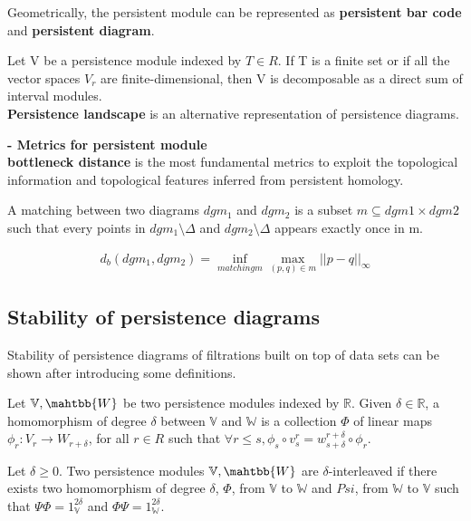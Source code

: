 Geometrically, the persistent module can be represented as \textbf{persistent bar code} and \textbf{persistent diagram}.

\begin{theorem}
Let V be a persistence module indexed by $T \in R$. If T is a finite set or if all the vector spaces $V_r$ are finite-dimensional, then V is decomposable as a direct sum of interval modules.\\
\textbf{Persistence landscape} is an alternative representation of persistence diagrams.\\
\end{theorem}

\textbf{- Metrics for persistent module}\\
\textbf{bottleneck distance} is the most fundamental metrics to exploit the topological information and topological features inferred from persistent homology.

\begin{definition}
A matching between two diagrams $dgm_1$ and $dgm_2$ is a subset $m \subseteq dgm1 \times dgm2$ such that every points in $dgm_1 \setminus \Delta$ and $dgm_2 \setminus \Delta$ appears exactly once in m.
\end{definition}

\begin{definition}
\begin{align*}
    d_b(dgm_1,dgm_2)=\inf_{matching m}\max_{(p,q)\in m}||p-q||_\infty
\end{align*}
\end{definition}

\subsection{Stability of persistence diagrams}
Stability of persistence diagrams of filtrations built
on top of data sets can be shown after introducing some definitions.

\begin{definition}
Let $\mathbb{V},\mahtbb{W}$ be two persistence modules indexed by $\mathbb{R}$. Given $\delta \in \mathbb{R}$, a homomorphism of degree $\delta$ between $\mathbb{V}$ and $\mathbb{W}$ is a collection $\Phi$ of linear maps $\phi_r : V_r \rightarrow W_{r+\delta }$, for all $r \in R$ such that $\forall r \leq s, \phi_s \circ v_s^r = w_{s+\delta}^{r+\delta}\circ \phi_r$.
\end{definition}
\begin{definition}
Let $\delta \geq 0$. Two persistence modules $\mathbb{V},\mahtbb{W}$ are $\delta$-interleaved if there exists two homomorphism of degree $\delta$, $\Phi$, from $\mathbb{V}$ to $\mathbb{W}$ and $Psi$, from $\mathbb{W}$ to $\mathbb{V}$ such that $\Psi \Phi = 1_\mathbb{V}^{2\delta}$ and $\Phi \Psi = 1_\mathbb{W}^{2\delta}$.\\
\end{definition}

